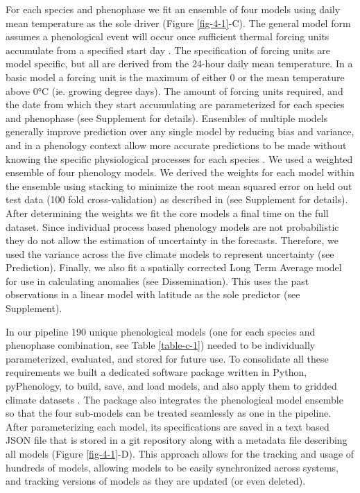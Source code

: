 For each species and phenophase we fit an ensemble of four models using daily mean temperature as the sole driver (Figure \ref{fig-4-1}-C). The general model form assumes a phenological event will occur once sufficient thermal forcing units accumulate from a specified start day \citep{chuine2013, chuine2017}. The specification of forcing units are model specific, but all are derived from the 24-hour daily mean temperature. In a basic model a forcing unit is the maximum of either 0 or the mean temperature above 0°C (ie. growing degree days). The amount of forcing units required, and the date from which they start accumulating are parameterized for each species and phenophase (see Supplement for details). Ensembles of multiple models generally improve prediction over any single model by reducing bias and variance, and in a phenology context allow more accurate predictions to be made without knowing the specific physiological processes for each species \citep{basler2016, yun2017, dormann2018}. We used a weighted ensemble of four phenology models. We derived the weights for each model within the ensemble using stacking to minimize the root mean squared error on held out test data (100 fold cross-validation) as described in \cite{dormann2018} (see Supplement for details). After determining the weights we fit the core models a final time on the full dataset. Since individual process based phenology models are not probabilistic they do not allow the estimation of uncertainty in the forecasts. Therefore, we used the variance across the five climate models to represent uncertainty (see Prediction). Finally, we also fit a spatially corrected Long Term Average model for use in calculating anomalies (see Dissemination). This uses the past observations in a linear model with latitude as the sole predictor (see Supplement). 

In our pipeline 190 unique phenological models (one for each species and phenophase combination, see Table \ref{table-c-1}) needed to be individually parameterized, evaluated, and stored for future use. To consolidate all these requirements we built a dedicated software package written in Python, pyPhenology, to build, save, and load models, and also apply them to gridded climate datasets \citep{taylor2018a}. The package also integrates the phenological model ensemble so that the four sub-models can be treated seamlessly as one in the pipeline. After parameterizing each model, its specifications are saved in a text based JSON file that is stored in a git repository along with a metadata file describing all models (Figure \ref{fig-4-1}-D). This approach allows for the tracking and usage of hundreds of models, allowing models to be easily synchronized across systems, and tracking versions of models as they are updated (or even deleted).  

